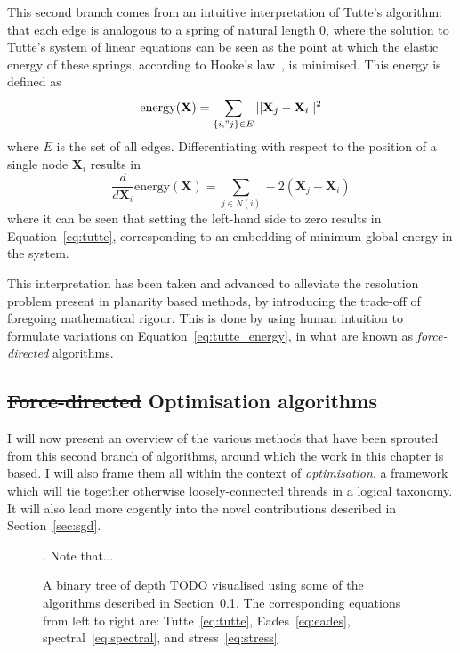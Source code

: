 This second branch comes from an intuitive interpretation of Tutte's algorithm: that each edge is analogous to a spring of natural length 0, where the solution to Tutte's system of linear equations can be seen as the point at which the elastic energy of these springs, according to Hooke's law~\cite{Hooke1678}, is minimised. This energy is defined as
\begin{equation}
    \mathrm{energy}(\mathbf{X}) = \sum_{\{i,"j\}\in E}||\mathbf{X}_j-\mathbf{X}_i||^2
\label{eq:tutte_energy}
\end{equation}
where $E$ is the set of all edges. Differentiating with respect to the position of a single node $\mathbf{X}_i$ results in
\begin{equation}
    \frac{d}{d\mathbf{X}_i}\mathrm{energy}(\mathbf{X}) = \sum_{j\in N(i)}-2(\mathbf{X}_j-\mathbf{X}_i)
\label{eq:tutte_force}
\end{equation}
where it can be seen that setting the left-hand side to zero results in Equation~\eqref{eq:tutte}, corresponding to an embedding of minimum global energy in the system.

This interpretation has been taken and advanced to alleviate the resolution problem present in planarity based methods, by introducing the trade-off of foregoing mathematical rigour. 
This is done by using human intuition to formulate variations on Equation~\eqref{eq:tutte_energy}, in what are known as \emph{force-directed} algorithms.

\subsection{\texorpdfstring{\st{Force-directed}{ Optimisation algorithms}}{}}
\label{sec:force_background}
I will now present an overview of the various methods that have been sprouted from this second branch of algorithms, around which the work in this chapter is based. I will also frame them all within the context of \emph{optimisation}, a framework which will tie together otherwise loosely-connected threads in a logical taxonomy.
It will also lead more cogently into the novel contributions described in Section~\ref{sec:sgd}.

\begin{figure}
    \caption{A binary tree of depth TODO visualised using some of the algorithms described in Section~\ref{sec:force_background}. The corresponding equations from left to right are: Tutte~\eqref{eq:tutte}, Eades~\eqref{eq:eades}, spectral~\eqref{eq:spectral}, and stress~\eqref{eq:stress}}.
    Note that...
    \label{fig:force_layouts}
\end{figure}

